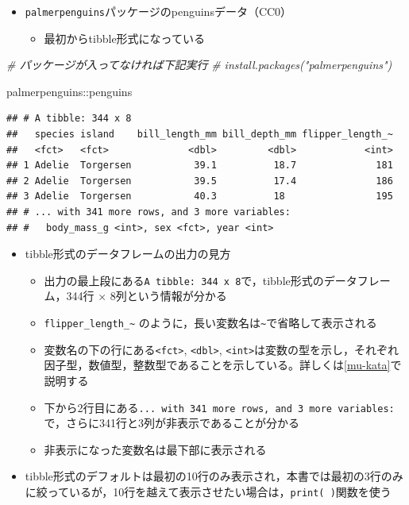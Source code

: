 \documentclass[
  xelatex,ja=standard, b5paper]{bxjsbook}
\newenvironment{Shaded}{\begin{snugshade}}{\end{snugshade}}
\newcommand{\CommentTok}[1]{\textcolor[rgb]{0.56,0.35,0.01}{\textit{#1}}}
\newcommand{\NormalTok}[1]{#1}
\newcommand{\SpecialCharTok}[1]{\textcolor[rgb]{0.00,0.00,0.00}{#1}}
\providecommand{\tightlist}{%
  \setlength{\itemsep}{0pt}\setlength{\parskip}{0pt}}
\begin{document}
\begin{itemize}
\tightlist
\item
  \texttt{palmerpenguins}パッケージのpenguinsデータ（CC0）

  \begin{itemize}
  \tightlist
  \item
    最初からtibble形式になっている
  \end{itemize}
\end{itemize}

\begin{Shaded}
\begin{Highlighting}[]
\CommentTok{\# パッケージが入ってなければ下記実行}
\CommentTok{\# install.packages("palmerpenguins")}

\NormalTok{palmerpenguins}\SpecialCharTok{::}\NormalTok{penguins}
\end{Highlighting}
\end{Shaded}

\begin{verbatim}
## # A tibble: 344 x 8
##   species island    bill_length_mm bill_depth_mm flipper_length_~
##   <fct>   <fct>              <dbl>         <dbl>            <int>
## 1 Adelie  Torgersen           39.1          18.7              181
## 2 Adelie  Torgersen           39.5          17.4              186
## 3 Adelie  Torgersen           40.3          18                195
## # ... with 341 more rows, and 3 more variables:
## #   body_mass_g <int>, sex <fct>, year <int>
\end{verbatim}

\begin{itemize}
\tightlist
\item
  tibble形式のデータフレームの出力の見方

  \begin{itemize}
  \tightlist
  \item
    出力の最上段にある\texttt{A\ tibble:\ 344\ x\ 8}で，tibble形式のデータフレーム，344行 × 8列という情報が分かる
  \item
    \texttt{flipper\_length\_\textasciitilde{}} のように，長い変数名は\texttt{\textasciitilde{}}で省略して表示される
  \item
    変数名の下の行にある\texttt{\textless{}fct\textgreater{}}, \texttt{\textless{}dbl\textgreater{}}, \texttt{\textless{}int\textgreater{}}は変数の型を示し，それぞれ因子型，数値型，整数型であることを示している。詳しくは\ref{mu-kata}で説明する
  \item
    下から2行目にある\texttt{...\ with\ 341\ more\ rows,\ and\ 3\ more\ variables:}で，さらに341行と3列が非表示であることが分かる
  \item
    非表示になった変数名は最下部に表示される
  \end{itemize}
\item
  tibble形式のデフォルトは最初の10行のみ表示され，本書では最初の3行のみに絞っているが，10行を越えて表示させたい場合は，\texttt{print(\ )}関数を使う
\end{itemize}
\end{document}
